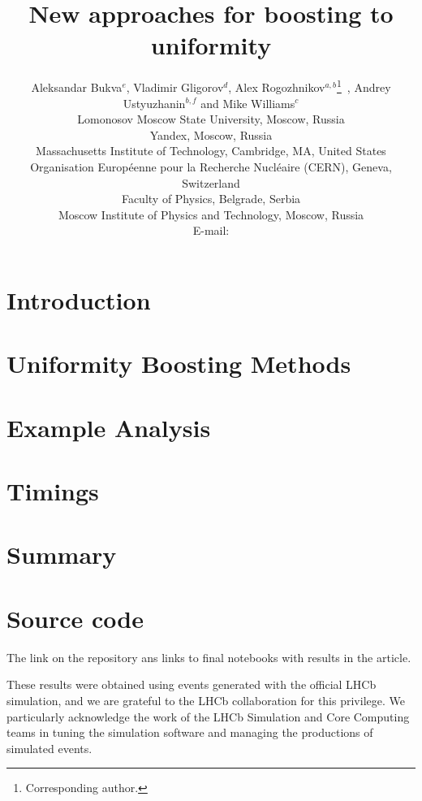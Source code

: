 \documentclass{JINST}
\title{New approaches for boosting to uniformity}
\author{
Aleksandar Bukva$^e$, 
Vladimir Gligorov$^d$,
Alex Rogozhnikov$^{a,b}$\thanks{Corresponding author.}~,\newline
Andrey Ustyuzhanin$^{b,f}$ and
Mike Williams$^c$\\
\llap{$^a$}Lomonosov Moscow State University, Moscow, Russia\\
\llap{$^b$}Yandex, Moscow, Russia\\
\llap{$^c$}Massachusetts Institute of Technology, Cambridge, MA, United States \\
\llap{$^d$}Organisation Europ\'eenne pour la Recherche Nucl\'eaire (CERN), Geneva, Switzerland  \\
\llap{$^e$}Faculty of Physics, Belgrade, Serbia \\
\llap{$^f$}Moscow Institute of Physics and Technology, Moscow, Russia\\
E-mail: \email{alex.rogozhnikov@yandex.ru}}
\theoremstyle{definition}
\theoremstyle{remark}
\begin{document}
\maketitle


\section{Introduction}



\section{Uniformity Boosting Methods}


\section{Example Analysis}




\section{Timings}



\section{Summary}



\section{Source code}


The link on the repository ans links to final notebooks with results in the article.

\acknowledgments

These results were obtained using events generated with the official LHCb simulation, and we are grateful to the LHCb collaboration for this privilege. 
We particularly acknowledge the work of the LHCb Simulation and Core Computing teams in tuning the simulation software and managing the productions of simulated events.
\end{document}
